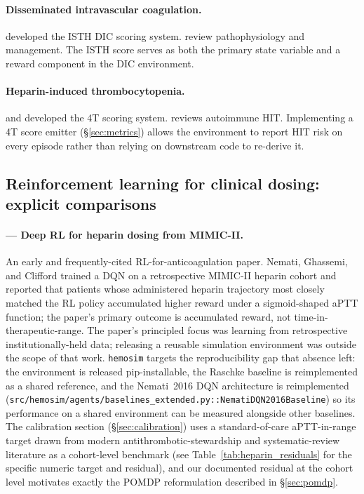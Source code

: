 \documentclass[11pt]{article}
\begin{document}
\paragraph{Disseminated intravascular coagulation.}
\citet{taylor2001} developed the ISTH DIC scoring system. \citet{levi1999, levi2009} review pathophysiology and management. The ISTH score serves as both the primary state variable and a reward component in the DIC environment.

\paragraph{Heparin-induced thrombocytopenia.}
\citet{warkentin2003} and \citet{lo2006} developed the 4T scoring system. \citet{greinacher2019} reviews autoimmune HIT. Implementing a 4T score emitter (\S\ref{sec:metrics}) allows the environment to report HIT risk on every episode rather than relying on downstream code to re-derive it.

\subsection{Reinforcement learning for clinical dosing: explicit comparisons}

\paragraph{\citet{nemati2016} --- Deep RL for heparin dosing from MIMIC-II.}
An early and frequently-cited RL-for-anticoagulation paper. Nemati, Ghassemi, and Clifford trained a DQN on a retrospective MIMIC-II heparin cohort and reported that patients whose administered heparin trajectory most closely matched the RL policy accumulated higher reward under a sigmoid-shaped aPTT function; the paper's primary outcome is accumulated reward, not time-in-therapeutic-range. The paper's principled focus was learning from retrospective institutionally-held data; releasing a reusable simulation environment was outside the scope of that work. \texttt{hemosim} targets the reproducibility gap that absence left: the environment is released pip-installable, the Raschke baseline is reimplemented as a shared reference, and the Nemati~2016 DQN architecture is reimplemented (\texttt{src/hemosim/agents/baselines\_extended.py::NematiDQN2016Baseline}) so its performance on a shared environment can be measured alongside other baselines. The calibration section (\S\ref{sec:calibration}) uses a standard-of-care aPTT-in-range target drawn from modern antithrombotic-stewardship and systematic-review literature \citep{wan2008} as a cohort-level benchmark (see Table~\ref{tab:heparin_residuals} for the specific numeric target and residual), and our documented residual at the cohort level motivates exactly the POMDP reformulation described in \S\ref{sec:pomdp}.
\end{document}
